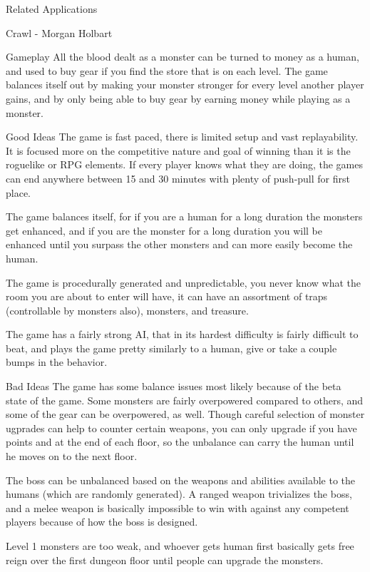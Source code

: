\documentclass[12pt]{report}
\begin{document}
\begin{section}{Related Applications}
\begin{subsection}{Crawl - Morgan Holbart}
\begin{subsubsection}{Gameplay}
All the blood dealt as a monster can be turned to money as a human, and
used to buy gear if you find the store that is on each level. The game
balances itself out by making your monster stronger for every level
another player gains, and by only being able to buy gear by earning money
while playing as a monster.
\end{subsubsection}

\begin{subsubsection}{Good Ideas}
The game is fast paced, there is limited setup and vast replayability. It
is focused more on the competitive nature and goal of winning than it is
the roguelike or RPG elements. If every player knows what they are doing,
the games can end anywhere between 15 and 30 minutes with plenty of
push-pull for first place.

The game balances itself, for if you are a human for a long duration the
monsters get enhanced, and if you are the monster for a long duration you
will be enhanced until you surpass the other monsters and can more easily
become the human.

The game is procedurally generated and unpredictable, you never know what
the room you are about to enter will have, it can have an assortment of
traps (controllable by monsters also), monsters, and treasure.

The game has a fairly strong AI, that in its hardest difficulty is fairly
difficult to beat, and plays the game pretty similarly to a human, give or
take a couple bumps in the behavior.
\end{subsubsection}

\begin{subsubsection}{Bad Ideas}
The game has some balance issues most likely because of the beta state of
the game. Some monsters are fairly  overpowered compared to others, and
some of the gear can be overpowered, as well. Though careful selection of
monster ugprades can help to counter certain weapons, you can only upgrade
if you have points and at the end of each floor, so the unbalance can
carry the human until he moves on to the next floor.

The boss can be unbalanced based on the weapons and abilities available to
the humans (which are randomly generated). A ranged weapon trivializes the
boss, and a melee weapon is basically impossible to win with against any
competent players because of how the boss is designed.

Level 1 monsters are too weak, and whoever gets human first basically gets
free reign over the first dungeon floor until people can upgrade the
monsters.
\end{subsubsection}


\end{subsection}
\end{section}
\end{document}
